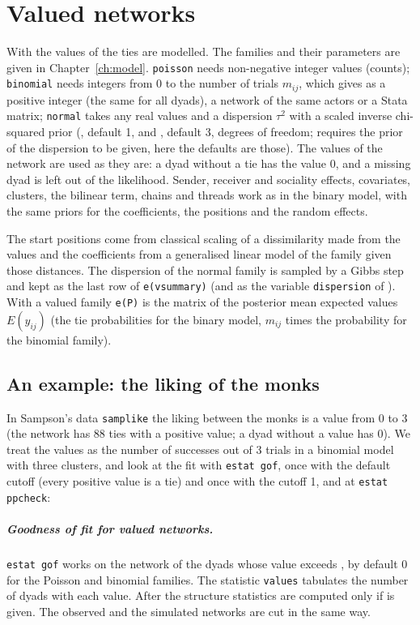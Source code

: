 \chapter{Valued networks}\label{ch:valued}

With  the values of the ties are modelled. The families and their parameters are given in Chapter~\ref{ch:model}. \texttt{poisson} needs non-negative integer values (counts); \texttt{binomial} needs integers from 0 to the number of trials $m_{ij}$, which  gives as a positive integer (the same for all dyads), a network of the same actors or a Stata matrix; \texttt{normal} takes any real values and a dispersion $\tau^2$ with a scaled inverse chi-squared prior (, default 1, and , default 3, degrees of freedom; \latentnet{} requires the prior of the dispersion to be given, here the defaults are those). The values of the network are used as they are: a dyad without a tie has the value 0, and a missing dyad is left out of the likelihood. Sender, receiver and sociality effects, covariates, clusters, the bilinear term, chains and threads work as in the binary model, with the same priors for the coefficients, the positions and the random effects.

The start positions come from classical scaling of a dissimilarity made from the values and the coefficients from a generalised linear model of the family given those distances. The dispersion of the normal family is sampled by a Gibbs step and kept as the last row of \texttt{e(vsummary)} (and as the variable \texttt{dispersion} of ). With a valued family \texttt{e(P)} is the matrix of the posterior mean expected values $E(y_{ij})$ (the tie probabilities for the binary model, $m_{ij}$ times the probability for the binomial family).

\section{An example: the liking of the monks}

In Sampson's data \texttt{samplike} the liking between the monks is a value from 0 to 3 (the network has 88 ties with a positive value; a dyad without a value has 0). We treat the values as the number of successes out of 3 trials in a binomial model with three clusters, and look at the fit with \texttt{estat gof}, once with the default cutoff (every positive value is a tie) and once with the cutoff 1, and at \texttt{estat ppcheck}:
\paragraph{Goodness of fit for valued networks.} \texttt{estat gof} works on the network of the dyads whose value exceeds , by default 0 for the Poisson and binomial families. The statistic \texttt{values} tabulates the number of dyads with each value. After  the structure statistics are computed only if  is given. The observed and the simulated networks are cut in the same way.

